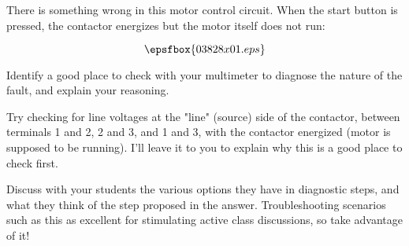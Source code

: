 

There is something wrong in this motor control circuit.  When the start button is pressed, the contactor energizes but the motor itself does not run:

$$\epsfbox{03828x01.eps}$$

Identify a good place to check with your multimeter to diagnose the nature of the fault, and explain your reasoning.







Try checking for line voltages at the "line" (source) side of the contactor, between terminals 1 and 2, 2 and 3, and 1 and 3, with the contactor energized (motor is supposed to be running).  I'll leave it to you to explain why this is a good place to check first.







Discuss with your students the various options they have in diagnostic steps, and what they think of the step proposed in the answer.  Troubleshooting scenarios such as this as excellent for stimulating active class discussions, so take advantage of it!




